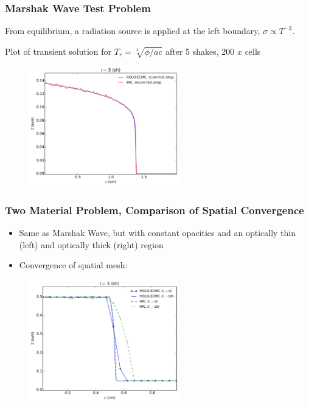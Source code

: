 \documentclass[xcolor=dvipsnames,hyperref={pdfpagelabels=false},handout,unknownkeysallowed]{beamer}
\newlength{\wideitemsep}
\let\olditem\item
\renewcommand{\item}{\setlength{\itemsep}{\wideitemsep}\olditem}
\begin{document}
\begin{frame}
    \frametitle{Marshak Wave Test Problem}
    \centering
    \begin{block}{}
        \begin{itemize}
                {\small
            \item From equilibrium, a radiation source is applied at the left
                boundary, $\sigma\propto T^{-3}$.
            \item Plot of transient solution for $T_r = \sqrt[4]{\phi/ac}$ after 5
            shakes, 200 $x$ cells }
        \end{itemize}
    \end{block}
    \begin{figure}
    \includegraphics[width=0.5799\textwidth]{marshak_200_compare.pdf}
    \end{figure}
\end{frame}

\begin{frame}
    \frametitle{Two Material Problem, Comparison of Spatial Convergence}
    \begin{block}{}
        \begin{itemize}
            \item Same as Marshak Wave, but with constant opacities and an optically thin (left) and
                optically thick (right) region 
            \item Convergence of spatial mesh:
        \end{itemize}
    \end{block}
\begin{figure}
    \centering
    \includegraphics[width=0.5799\textwidth]{two_mat_conv.pdf}
\end{figure}

\end{frame}
\end{document}
